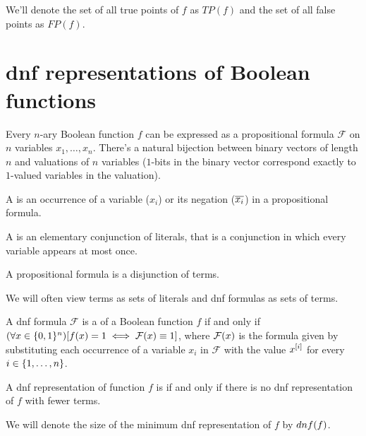We'll denote the set of all true points of $f$ as $TP(f)$
and the set of all false points as $FP(f)$.

\section{\texorpdfstring{\acrshort{dnf}}{DNF}
representations of Boolean functions}

Every $n$-ary Boolean function $f$ can be expressed
as a propositional formula $\mathcal{F}$ on $n$ variables
$x_1, \ldots, x_n$.
There's a natural bijection
between binary vectors of length $n$
and valuations of $n$ variables
($1$-bits in the binary vector
correspond exactly to $1$-valued variables
in the valuation).


\begin{definition}
A  is an occurrence
of a variable ($x_i$) or its negation ($\overline{x_i}$)
in a propositional formula.

A  is
an elementary conjunction of literals,
that is a conjunction in which every variable appears
at most once.

A  propositional formula
is a disjunction of terms.

We will often view terms as sets of literals
and \acrshort{dnf} formulas as sets of terms.
\end{definition}

A \acrshort{dnf} formula $\mathcal{F}$ is
a 
of a Boolean function $f$
if and only if
$(\forall x \in \{0, 1\}^n) [f(x) = 1 \iff
\mathcal{F} (x) \equiv 1]$,
where $\mathcal{F} (x)$ is the formula
given by substituting
each occurrence of a variable $x_i$ in $\mathcal{F}$
with the value $x^{[i]}$
for every $i \in \{1, \ldots, n\}$.

\begin{definition}
A \acrshort{dnf} representation of function $f$ is
if and only if
there is no \acrshort{dnf} representation of $f$
with fewer terms.

We will denote the size of the minimum \acrshort{dnf}
representation of $f$ by $dnf (f)$.
\end{definition}


